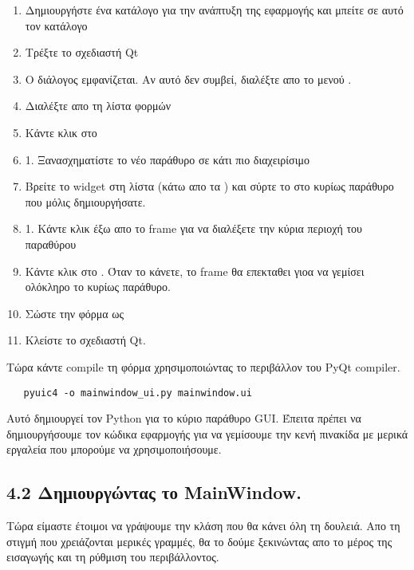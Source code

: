 \begin{enumerate}
\item  Δημιουργήστε ένα κατάλογο για την ανάπτυξη της εφαρμογής και μπείτε σε αυτό τον κατάλογο
\item  Τρέξτε το σχεδιαστή Qt
\item Ο διάλογος  εμφανίζεται. Αν αυτό δεν συμβεί, διαλέξτε
 απο το μενού .
\item Διαλέξτε  απο τη λίστα φορμών 
\item Κάντε κλικ στο  
\item 1. Ξανασχηματίστε το νέο παράθυρο σε κάτι πιο διαχειρίσιμο
\item Βρείτε το  widget στη λίστα
(κάτω απο τα ) και σύρτε το στο κυρίως παράθυρο που μόλις δημιουργήσατε.
\item 1. Κάντε κλικ έξω απο το frame για να διαλέξετε την κύρια περιοχή του παραθύρου
\item Κάντε κλικ στο  . Όταν το κάνετε, το frame
θα επεκταθει γιοα να γεμίσει ολόκληρο το κυρίως παράθυρο. 
\item Σώστε την φόρμα ως   
\item \qtdropmenuopt Κλείστε το σχεδιαστή Qt.
\end{enumerate} 

Τώρα κάντε compile τη φόρμα χρησιμοποιώντας το περιβάλλον του PyQt compiler. 

\begin{verbatim}
   pyuic4 -o mainwindow_ui.py mainwindow.ui
\end{verbatim}

Αυτό δημιουργεί  τον Python για το κύριο παράθυρο GUI. Έπειτα πρέπει να δημιουργήσουμε τον κώδικα εφαρμογής για να γεμίσουμε την κενή πινακίδα με μερικά εργαλεία που μπορούμε να χρησιμοποιήσουμε. 

\subsection{4.2 Δημιουργώντας το MainWindow.}

Τώρα είμαστε έτοιμοι να γράψουμε την κλάση  που θα κάνει όλη τη δουλειά.
Απο τη στιγμή που χρειάζονται μερικές γραμμές, θα το δούμε ξεκινώντας απο το μέρος της εισαγωγής και τη ρύθμιση του περιβάλλοντος.

